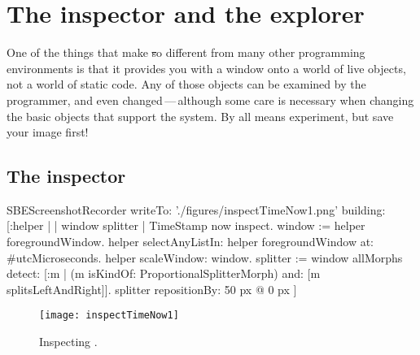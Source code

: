 \documentclass[a4paper,10pt,twoside]{book}
\begin{document}
\begin{comment}
One of the most important functions for a version management tool is to let the user build a package out of a number of smaller packages.
For example, a complex package like refactoring support might be made up of the refactoring engine itself, a GUI, and the services interface that makes it accessible to other tools.
Each of these components goes in its own package, and yet,  for the convenience of the user, the whole needs to be available as a single package.

How is this accomplished using Monticello?  \ab{How indeed?  I hope that someone can write this section, because I haven't a clue, but would really like to know.}
\end{comment}

\section{The inspector and the explorer}
\label{sec:inspector} %

One of the things that make \st so different from many other programming environments is that it provides you with a window onto a world of live objects, not a world of static code.
Any of those objects can be examined by the programmer, and even changed\,---\,although some care is necessary when changing the basic objects that support the system.
By all means experiment, but save your image first!

\subsection{The inspector}


\begin{ExecuteSmalltalkScript}
SBEScreenshotRecorder writeTo: './figures/inspectTimeNow1.png' building: [:helper | | window splitter |
	TimeStamp now inspect.
	window := helper foregroundWindow.
	helper selectAnyListIn: helper foregroundWindow at: #utcMicroseconds.
	helper scaleWindow: window.
	splitter := window allMorphs detect: [:m |
		(m isKindOf: ProportionalSplitterMorph) and: [m splitsLeftAndRight]].
	splitter repositionBy: 50 px @ 0 px
]
\end{ExecuteSmalltalkScript}
\begin{figure}[btp]
	\begin{center}
		\texttt{[image: inspectTimeNow1]}
	\end{center}
	\caption{Inspecting .}
	\label{fig:inspectTimeNow1}
\end{figure}
\end{document}
